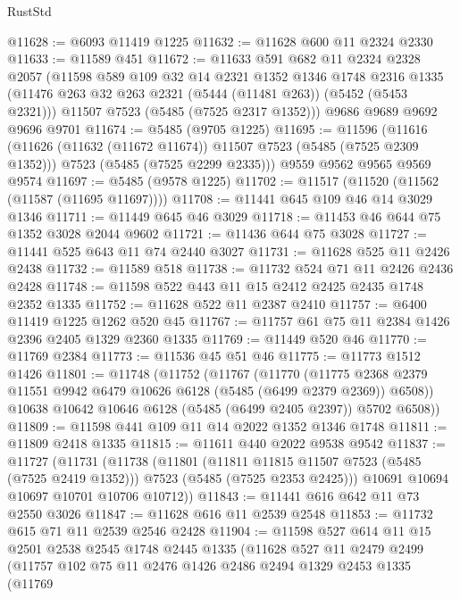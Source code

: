 \begin{lexlean}{RustStd}
\begin{coremodule}
@11628 := @6093 @11419 @1225
@11632 := @11628 @600 @11 @2324 @2330
@11633 := @11589 @451
@11672 := @11633
    @591
    @682
    @11
    @2324
    @2328
    @2057
    (@11598
      @589
      @109
      @32
      @14
      @2321
      @1352
      @1346
      @1748
      @2316
      @1335
      (@11476 @263 @32 @263 @2321 (@5444 (@11481 @263)) (@5452 (@5453 @2321)))
      @11507
      @7523
      (@5485 (@7525 @2317 @1352)))
    @9686
    @9689
    @9692
    @9696
    @9701
@11674 := @5485 (@9705 @1225)
@11695 := @11596
    (@11616
      (@11626 (@11632 (@11672 @11674)) @11507 @7523 (@5485 (@7525 @2309 @1352)))
      @7523
      (@5485 (@7525 @2299 @2335)))
    @9559
    @9562
    @9565
    @9569
    @9574
@11697 := @5485 (@9578 @1225)
@11702 := @11517 (@11520 (@11562 (@11587 (@11695 @11697))))
@11708 := @11441 @645 @109 @46 @14 @3029 @1346
@11711 := @11449 @645 @46 @3029
@11718 := @11453 @46 @644 @75 @1352 @3028 @2044 @9602
@11721 := @11436 @644 @75 @3028
@11727 := @11441 @525 @643 @11 @74 @2440 @3027
@11731 := @11628 @525 @11 @2426 @2438
@11732 := @11589 @518
@11738 := @11732 @524 @71 @11 @2426 @2436 @2428
@11748 := @11598 @522 @443 @11 @15 @2412 @2425 @2435 @1748 @2352 @1335
@11752 := @11628 @522 @11 @2387 @2410
@11757 := @6400 @11419 @1225 @1262 @520 @45
@11767 := @11757 @61 @75 @11 @2384 @1426 @2396 @2405 @1329 @2360 @1335
@11769 := @11449 @520 @46
@11770 := @11769 @2384
@11773 := @11536 @45 @51 @46
@11775 := @11773 @1512 @1426
@11801 := @11748
    (@11752
      (@11767
        (@11770
          (@11775 @2368 @2379 @11551 @9942 @6479 @10626 @6128 (@5485 (@6499 @2379 @2369)) @6508))
        @10638
        @10642
        @10646
        @6128
        (@5485 (@6499 @2405 @2397))
        @5702
        @6508))
@11809 := @11598 @441 @109 @11 @14 @2022 @1352 @1346 @1748
@11811 := @11809 @2418 @1335
@11815 := @11611 @440 @2022 @9538 @9542
@11837 := @11727
    (@11731
      (@11738
        (@11801
          (@11811 @11815 @11507 @7523 (@5485 (@7525 @2419 @1352)))
          @7523
          (@5485 (@7525 @2353 @2425)))
        @10691
        @10694
        @10697
        @10701
        @10706
        @10712))
@11843 := @11441 @616 @642 @11 @73 @2550 @3026
@11847 := @11628 @616 @11 @2539 @2548
@11853 := @11732 @615 @71 @11 @2539 @2546 @2428
@11904 := @11598
    @527
    @614
    @11
    @15
    @2501
    @2538
    @2545
    @1748
    @2445
    @1335
    (@11628
      @527
      @11
      @2479
      @2499
      (@11757
        @102
        @75
        @11
        @2476
        @1426
        @2486
        @2494
        @1329
        @2453
        @1335
        (@11769

\end{coremodule}
\end{lexlean}
